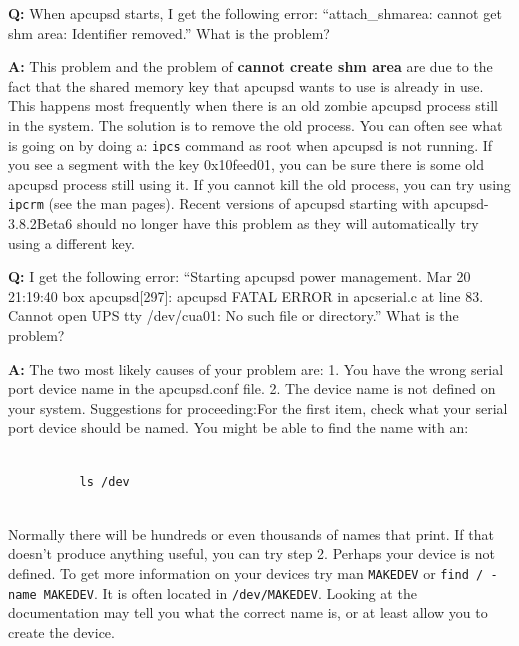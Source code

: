 \begin{description}
\item {\bf Q:}
When apcupsd starts, I get the following error: ``attach\_shmarea: cannot get
shm area: Identifier removed.'' What is the problem?  

\item {\bf A:}
This problem and the problem of {\bf cannot create shm area} are due to the
fact that the shared memory key that apcupsd wants to use is already in use.
This happens most frequently when there is an old zombie apcupsd process still
in the system.  The solution is to remove the old process.  You can often see
what is going on by doing a: {\tt ipcs} command as root when apcupsd is not
running. If you see a segment with the key 0x10feed01, you can be sure there
is some old apcupsd process still using it. If you cannot kill the old
process, you can try using {\tt ipcrm} (see the man pages).  Recent versions
of apcupsd starting with apcupsd-3.8.2Beta6 should no longer have this problem
as they will automatically try using a different key.  

\item {\bf Q:}
I get the following error: ``Starting apcupsd power management.  Mar 20
21:19:40 box apcupsd[297]: apcupsd FATAL ERROR in apcserial.c at line 83.
Cannot open UPS tty /dev/cua01: No such file or directory.'' What is the
problem?  

\item {\bf A:}
The two most likely causes of your problem are:  1. You have the wrong serial
port device name in the apcupsd.conf file. 2. The device name is not defined
on your system. Suggestions for proceeding:For the first item, check what your
serial port device should be named. You might be able to find the name with
an:  

\footnotesize
\begin{verbatim}
          
          ls /dev
     
\end{verbatim}
\normalsize

Normally there will be hundreds or even thousands of names that print. If that
doesn't produce anything useful, you can try step 2.  Perhaps your device is
not defined. To get more information on your devices try man {\tt MAKEDEV} or
{\tt find / -name MAKEDEV}.  It is often located in {\tt /dev/MAKEDEV}. 
Looking at the documentation may tell you what the correct name is, or at
least allow you to create the device.  


\end{description}

